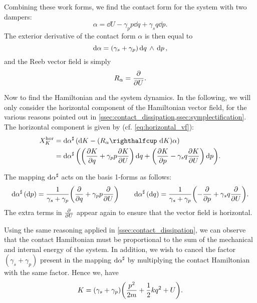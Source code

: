 Combining these work forms, we find the contact form for the system with two dampers:
\begin{equation}
    \alpha = \dd{U} - \gamma_p p\dd{q} + \gamma_s q \dd{p}.
    \label{eq:serial_dho_contact_form}
\end{equation}
The exterior derivative of the contact form \(\alpha\) is then equal to
\begin{equation}
     \dd{\alpha} = (\gamma_s + \gamma_p)  \dd{q}\,\wedge\,\dd{p} ,
\end{equation}
and the Reeb vector field is simply
\begin{equation}
     R_\alpha = \pdv{}{U}.
\end{equation}

Now to find the Hamiltonian and the system dynamics. In the following, we will only consider the horizontal component of the Hamiltonian vector field, for the various reasons pointed out in \cref{ssec:contact_dissipation,ssec:symplectification}. The horizontal component is given by (cf. \cref{eq:horizontal_vf}):
\begin{equation}
    \begin{split}
        X^\text{hor}_K &= \fromDual{\dd{\alpha}}\qty(\dd{K} - (\intpr{R_\alpha}{\dd{K}})\alpha) \\
                       &= \fromDual{\dd{\alpha}}\qty(\qty(\pdv{K}{q} + \gamma_p p \pdv{K}{U})\dd{q} + \qty(\pdv{K}{p} - \gamma_s q \pdv{K}{U})\dd{p}).
    \end{split}
\end{equation}

The mapping \(\dd{\alpha}^\sharp\) acts on the basis 1-forms as follows:
\begin{equation}
     \dd{\alpha}^\sharp(\dd{p}) = \frac{1}{\gamma_s + \gamma_p}\qty(\pdv{}{q} + \gamma_p p\pdv{}{U}) \qquad
    \dd{\alpha}^\sharp(\dd{q}) = \frac{1}{\gamma_s + \gamma_p}\qty(-\pdv{}{p} + \gamma_s q\pdv{}{U}).
\end{equation}
The extra terms in \(\pdv{}{U}\) appear again to ensure that the vector field is horizontal.

Using the same reasoning applied in \cref{ssec:contact_dissipation}, we can observe that the contact Hamiltonian must be proportional to the sum of the mechanical and internal energy of the system. In addition, we wish to cancel the factor \((\gamma_s + \gamma_p)\) present in the mapping \(\dd{\alpha}^\sharp\) by multiplying the contact Hamiltonian with the same factor. Hence we, have
\begin{equation}
     K = (\gamma_s + \gamma_p)\qty(\frac{p^2}{2m} + \frac{1}{2}kq^2 + U).
\end{equation}

